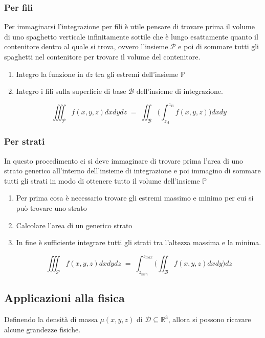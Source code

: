 \documentclass[10pt,a4paper]{report}
\begin{document}
			\subsubsection{Per fili}
			Per immaginarsi l'integrazione per fili è utile pensare di trovare prima il volume di uno spaghetto verticale infinitamente sottile che è lungo esattamente quanto il contenitore dentro al quale si trova, ovvero l'insieme $\mathcal{P}$ e poi di sommare tutti gli spaghetti nel contenitore per trovare il volume del contenitore.
				\begin{enumerate}
					\item Integro la funzione in $ dz $ tra gli estremi dell'insieme $ \mathbb{P} $
					\item Integro i fili sulla superficie di base $ \mathcal{B} $ dell'insieme di integrazione.
					
					\[ \iiint_{\mathcal{P}} f(x,y,z) dxdydz \; = \; \iint_{\mathcal{B}} \Big(\int_{z_{A}}^{z_{B}} f(x,y,z)\Big) dxdy\]
					
				\end{enumerate}
			\subsubsection{Per strati}
			In questo procedimento ci si deve immaginare di trovare prima l'area di uno strato generico all'interno dell'insieme di integrazione e poi immagino di sommare tutti gli strati in modo di ottenere tutto il volume dell'insieme $ \mathbb{P} $
				\begin{enumerate}
					\item Per prima cosa è necessario trovare gli estremi massimo e minimo per cui si può trovare uno strato
					\item Calcolare l'area di un generico strato
					\item In fine è sufficiente integrare tutti gli strati tra l'altezza massima e la minima.
					
					\[ \iiint_{\mathcal{P}} f(x,y,z) dxdydz \; = \; \int_{z_{min}}^{z_{max}} \Big(\iint_{\mathcal{B}} f(x,y,z) dxdy\Big)dz \]
					
				\end{enumerate}
		
		\subsection*{Applicazioni alla fisica}
		Definendo la densità  di massa $ \mu (x,y,z) $ di $\mathcal{D}\subseteq \mathbb{R}^{3}$, allora si possono ricavare alcune grandezze fisiche.
\end{document}
